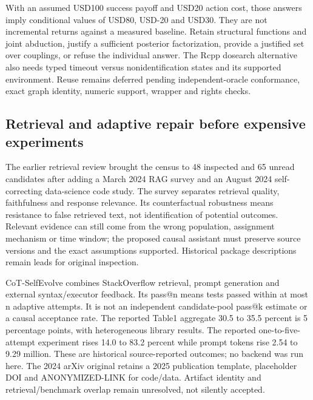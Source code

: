 With an assumed USD100 success payoff and USD20 action cost, those
answers imply conditional values of USD80, USD-20 and USD30. They are
not incremental returns against a measured baseline. Retain structural
functions and joint abduction, justify a sufficient posterior
factorization, provide a justified set over couplings, or refuse the
individual answer. The Rcpp dosearch alternative also needs typed
timeout versus nonidentification states and its supported environment.
Reuse remains deferred pending independent-oracle conformance, exact
graph identity, numeric support, wrapper and rights checks.
\citep{exec19_cxx_identification_source,exec19_cxx_identification_reference}

\hypertarget{retrieval-and-adaptive-repair-before-expensive-experiments}{%
\subsection{Retrieval and adaptive repair before expensive
experiments}\label{retrieval-and-adaptive-repair-before-expensive-experiments}}

The earlier retrieval review brought the census to 48 inspected and 65
unread candidates after adding a March 2024 RAG survey and an August
2024 self-correcting data-science code study. The survey separates
retrieval quality, faithfulness and response relevance. Its
counterfactual robustness means resistance to false retrieved text, not
identification of potential outcomes. Relevant evidence can still come
from the wrong population, assignment mechanism or time window; the
proposed causal assistant must preserve source versions and the exact
assumptions supported. Historical package descriptions remain leads for
original inspection. \citep{exec19_rag_survey}

CoT-SelfEvolve combines StackOverflow retrieval, prompt generation and
external syntax/executor feedback. Its pass@n means tests passed within
at most n adaptive attempts. It is not an independent candidate-pool
pass@k estimate or a causal acceptance rate. The reported Table1
aggregate 30.5 to 35.5 percent is 5 percentage points, with
heterogeneous library results. The reported one-to-five-attempt
experiment rises 14.0 to 83.2 percent while prompt tokens rise 2.54 to
9.29 million. These are historical source-reported outcomes; no backend
was run here. The 2024 arXiv original retains a 2025 publication
template, placeholder DOI and ANONYMIZED-LINK for code/data. Artifact
identity and retrieval/benchmark overlap remain unresolved, not silently
accepted. \citep{exec19_selfcorrection_study}

